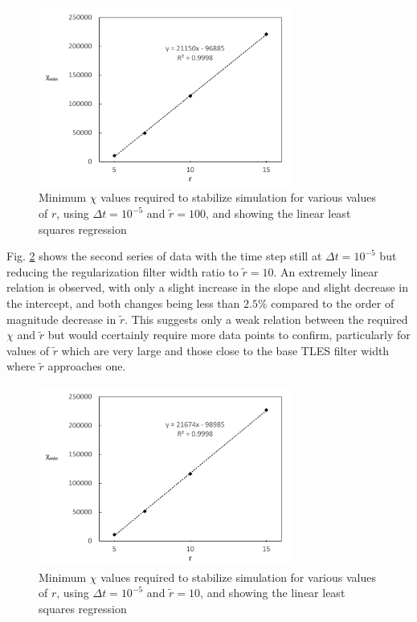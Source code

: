 \begin{figure}[!tb]
\centering
\includegraphics[width=0.75\textwidth]{figures/min_chi_dt5_r100.pdf}
\caption{Minimum $\chi$ values required to stabilize simulation for various values of $r$, using $\Delta t=10^{-5}$ and $\tilde{r}=100$, and showing the linear least squares regression}
\label{fig:min_chi_dt5_r100}
\end{figure}

Fig. \ref{fig:min_chi_dt5_r10} shows the second series of data  with the time step still at $\Delta t=10^{-5}$ but reducing the regularization filter width ratio to $\tilde{r}=10$. An extremely linear relation is observed, with only a slight increase in the slope and slight decrease in the intercept, and both changes being less than $2.5\%$ compared to the order of magnitude decrease in $\tilde{r}$. This suggests only a weak relation between the required $\chi$ and $\tilde{r}$ but would ccertainly require more data points to confirm, particularly for values of $\tilde{r}$ which are very large and those close to the base TLES filter width where $\tilde{r}$ approaches one.

\begin{figure}[!tb]
\centering
\includegraphics[width=0.75\textwidth]{figures/min_chi_dt5_r10.pdf}
\caption{Minimum $\chi$ values required to stabilize simulation for various values of $r$, using $\Delta t=10^{-5}$ and $\tilde{r}=10$, and showing the linear least squares regression}
\label{fig:min_chi_dt5_r10}
\end{figure}

